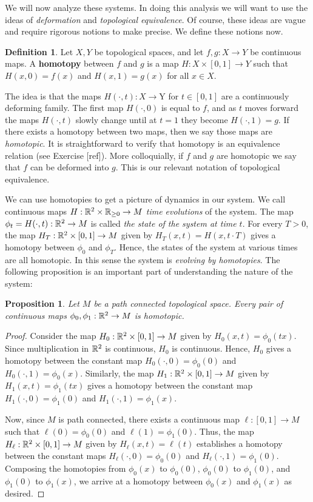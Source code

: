 \documentclass{article}
\newtheorem{proposition}{Proposition}[section]
\theoremstyle{definition}
\newtheorem*{definition}{Definition}
\numberwithin{figure}{section}
\begin{document}
We will now analyze these systems. In doing this analysis we will want to use the ideas of \textit{deformation} and \textit{topological equivalence}. Of course, these ideas are vague and require rigorous notions to make precise. We define these notions now.

\begin{definition}
Let $X,Y$ be topological spaces, and let $f,g: X\to Y$ be continuous maps. A \textbf{homotopy} between $f$ and $g$ is a map $H: X\times [0,1] \to Y$ such that $H(x, 0)=f(x)$ and $H(x,1)=g(x)$ for all $x\in X$.
\end{definition}

The idea is that the maps $H(\cdot,t):X\to $Y for $t\in [0,1]$ are a continuously deforming family. The first map $H(\cdot, 0)$ is equal to $f$, and as $t$ moves forward the maps $H(\cdot,t)$ slowly change until at $t=1$ they become $H(\cdot,1)=g$. If there exists a homotopy between two maps, then we say those maps are \textit{homotopic}. It is straightforward to verify that homotopy is an equivalence relation (see Exercise [ref]). More colloquially, if $f$ and $g$ are homotopic we say that $f$ can be deformed into $g$. This is our relevant notation of topological equivalence.

We can use homotopies to get a picture of dynamics in our system. We call continuous maps $H: \mathbb{R}^2 \times \mathbb{R}_{\geq 0}\to M$ \textit{time evolutions} of the system. The map $\phi_t=H(\cdot,t): \mathbb{R}^2\to M$ is called \textit{the state of the system at time $t$}. For every $T>0$, the map $H_T:\mathbb{R}^2\times [0,1]\to M$ given by $H_T(x,t)=H(x,t\cdot T)$ gives a homotopy between $\phi_0$ and $\phi_T$. Hence, the states of the system at various times are all homotopic. In this sense the system is \textit{evolving by homotopies}. The following proposition is an important part of understanding the nature of the system:

\begin{proposition}
Let $M$ be a path connected topological space. Every pair of continuous maps $\phi_0,\phi_1:\mathbb{R}^2\to M$ is homotopic.
\end{proposition}
\begin{proof}
Consider the map $H_0: \mathbb{R}^2\times [0,1]\to M$ given by $H_0(x,t)=\phi_0(tx)$. Since multiplication in $\mathbb{R}^2$ is continuous, $H_0$ is continuous. Hence, $H_0$ gives a homotopy between the constant map $H_0(\cdot,0)=\phi_0(0)$ and $H_0(\cdot,1)=\phi_0(x)$. Similarly, the map $H_1:\mathbb{R}^2\times [0,1]\to M$  given by $H_1(x,t)=\phi_1(tx)$ gives a homotopy between the constant map $H_1(\cdot,0)=\phi_1(0)$ and $H_1(\cdot,1)=\phi_1(x)$.

Now, since $M$ is path connected, there exists a continuous map $\ell: [0,1]\to M$ such that $\ell(0)=\phi_0(0)$ and $\ell(1)=\phi_1(0)$. Thus, the map $H_\ell:\mathbb{R}^2\times [0,1]\to M$ given by $H_\ell(x,t)=\ell(t)$ establishes a homotopy between the constant maps $H_\ell(\cdot,0)=\phi_0(0)$ and $H_\ell(\cdot,1)=\phi_1(0)$. Composing the homotopies from $\phi_0(x)$ to $\phi_0(0)$, $\phi_0(0)$ to $\phi_1(0)$, and $\phi_1(0)$ to $\phi_1(x)$, we arrive at a homotopy between $\phi_0(x)$ and $\phi_1(x)$ as desired.
\end{proof}
\end{document}
